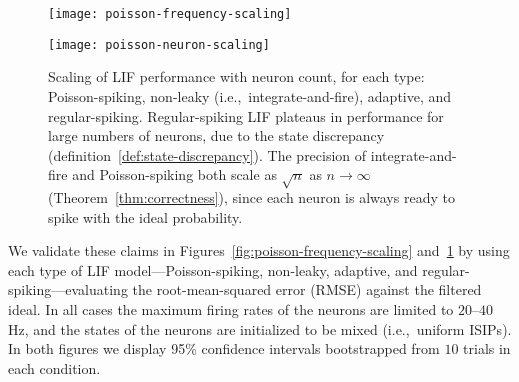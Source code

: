 \begin{figure}
\centering
\texttt{[image: poisson-frequency-scaling]}
\caption{\label{fig:poisson-frequency-scaling} Scaling of LIF performance with frequency, for each type: Poisson-spiking, non-leaky (i.e.,~integrate-and-fire), adaptive, and regular-spiking.
The input is a sinusoid with frequency $f$\,Hz.
Due to the memoryless property of the Poisson process, and the uniformity of ReLU, both outperform LIF with constant precision as $f \rightarrow \infty$ (Theorem~\ref{thm:correctness}), assuming $n$ and $\tau$ are scaled appropriately with frequency (see text for details).
}

\vspace{1em}

\texttt{[image: poisson-neuron-scaling]}
\caption{\label{fig:poisson-neuron-scaling} Scaling of LIF performance with neuron count, for each type: Poisson-spiking, non-leaky (i.e.,~integrate-and-fire), adaptive, and regular-spiking.
Regular-spiking LIF plateaus in performance for large numbers of neurons, due to the state discrepancy (definition~\ref{def:state-discrepancy}).
The precision of integrate-and-fire and Poisson-spiking both scale as ${\sqrt{n}}$ as $n \rightarrow \infty$ (Theorem~\ref{thm:correctness}), since each neuron is always ready to spike with the ideal probability. 
}
\end{figure}

We validate these claims in Figures~\ref{fig:poisson-frequency-scaling} and~\ref{fig:poisson-neuron-scaling} by using each type of LIF model---Poisson-spiking, non-leaky, adaptive, and regular-spiking---evaluating the root-mean-squared error (RMSE) against the filtered ideal.
In all cases the maximum firing rates of the neurons are limited to $20$--$40$\,Hz, and the states of the neurons are initialized to be mixed (i.e.,~uniform ISIPs).
In both figures we display 95\% confidence intervals bootstrapped from $10$ trials in each condition.

